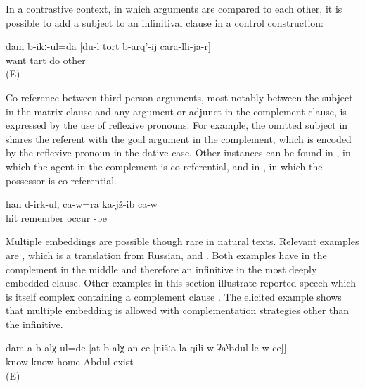 In a contrastive context, in which arguments are compared to each other, it is possible to add a subject to an infinitival clause in a control construction:
%
\begin{exe}
	\ex	\label{ex:‎I want to make the tart than another person}
	\gll	dam	b-ikː-ul=da	[du-l	tort	b-arq'-ij	cara-lli-ja-r]\\
			want		tart do	other\\
	\glt	{} (E)
\end{exe}

Co-reference between third person arguments, most notably between the subject in the matrix clause and any argument or adjunct in the complement clause, is expressed by the use of reflexive pronouns. For example, the omitted subject in  shares the referent with the goal argument in the complement, which is encoded by the reflexive pronoun in the dative case. Other instances can be found in , in which the agent in the complement is co-referential, and in , in which the possessor is co-referential.
%
\begin{exe}
	\ex	\label{ex:He is sitting and remembering how (they) beat him up}
	\gll	[cini-j	d-aˁq-ib-te=ra]	han	d-irk-ul,	ca-w=ra	ka-jž-ib	ca-w\\
		 hit	remember	occur		-be	\\
	\glt	{}
\end{exe}

Multiple embeddings are possible though rare in natural texts. Relevant examples are , which is a translation from Russian, and . Both examples have  in the complement in the middle and therefore an infinitive in the most deeply embedded clause. Other examples in this section illustrate reported speech which is itself complex containing a complement clause . The elicited example  shows that multiple embedding is allowed with complementation strategies other than the infinitive.
%
\begin{exe}
	\ex	\label{ex:‎‎‎I did not know that you know that Abdul was at our place}
	\gll	dam	a-b-alχ-ul=de	[at	b-alχ-an-ce	[nišːa-la	qili-w	ʡaˁbdul	le-w-ce]]\\
			know		know		home	Abdul	exist-\\
	\glt	{} (E)
\end{exe}

